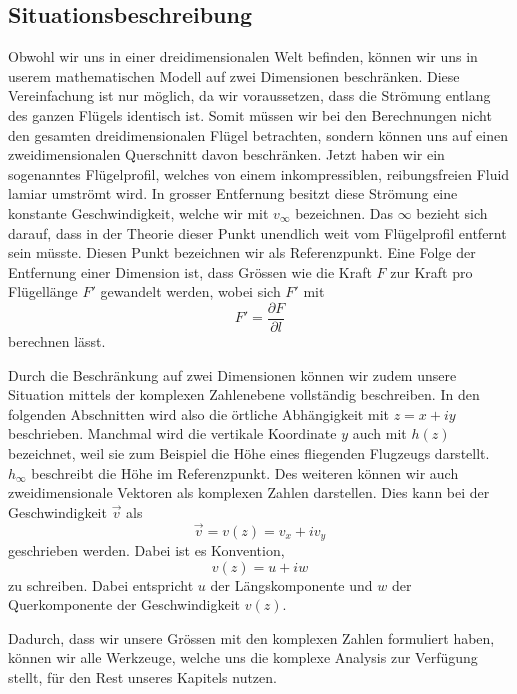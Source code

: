 \subsection{Situationsbeschreibung}
\label{joukowski:voraussetzungen:situationsbeschreibung}

	Obwohl wir uns in einer dreidimensionalen Welt befinden,
	können wir uns in userem mathematischen Modell auf zwei Dimensionen beschränken.
	Diese Vereinfachung ist nur möglich, da wir voraussetzen, dass die Strömung entlang des ganzen Flügels identisch ist.
	Somit müssen wir bei den Berechnungen nicht den gesamten dreidimensionalen Flügel betrachten,
	sondern können uns auf einen zweidimensionalen Querschnitt davon beschränken.
%
	Jetzt haben wir ein sogenanntes Flügelprofil, welches von einem inkompressiblen, reibungsfreien Fluid lamiar umströmt wird.
	In grosser Entfernung besitzt diese Strömung eine konstante Geschwindigkeit,
	welche wir mit $v_\infty$ bezeichnen. 
	Das $\infty$ bezieht sich darauf, dass in der Theorie dieser Punkt unendlich weit vom Flügelprofil entfernt sein müsste. Diesen Punkt bezeichnen wir als Referenzpunkt.
%
	Eine Folge der Entfernung einer Dimension ist,
	dass Grössen wie die Kraft $F$ zur Kraft pro Flügellänge $F'$ gewandelt werden,
	wobei sich $F'$ mit
	\[
		F'
		=
		\frac{\partial F}{\partial l}
	\]
	berechnen lässt.
	
	Durch die Beschränkung auf zwei Dimensionen können wir zudem unsere Situation mittels der komplexen Zahlenebene vollständig beschreiben.
	In den folgenden Abschnitten wird also die örtliche Abhängigkeit mit $z = x + iy$ beschrieben. Manchmal wird die vertikale Koordinate $y$ auch mit $h(z)$ bezeichnet,
	weil sie zum Beispiel die Höhe eines fliegenden Flugzeugs darstellt. $h_\infty$ beschreibt die Höhe im Referenzpunkt.
%
	Des weiteren können wir auch zweidimensionale Vektoren als komplexen Zahlen darstellen.
	Dies kann bei der Geschwindigkeit $\vec{v}$ als
	\[
		\vec{v}
		=
		v(z)
		=
		v_x + i v_y
	\]
	geschrieben werden.
	Dabei ist es Konvention,
	\begin{equation}
		v(z)
		=
		u + iw
\label{joukowski:vkonvention}
	\end{equation}
	zu schreiben.
	Dabei entspricht $u$ der Längskomponente und $w$ der Querkomponente der Geschwindigkeit $v(z)$.
	
	Dadurch, dass wir unsere Grössen mit den komplexen Zahlen formuliert haben, können wir alle Werkzeuge, welche uns die komplexe Analysis zur Verfügung stellt, für den Rest unseres Kapitels nutzen.
